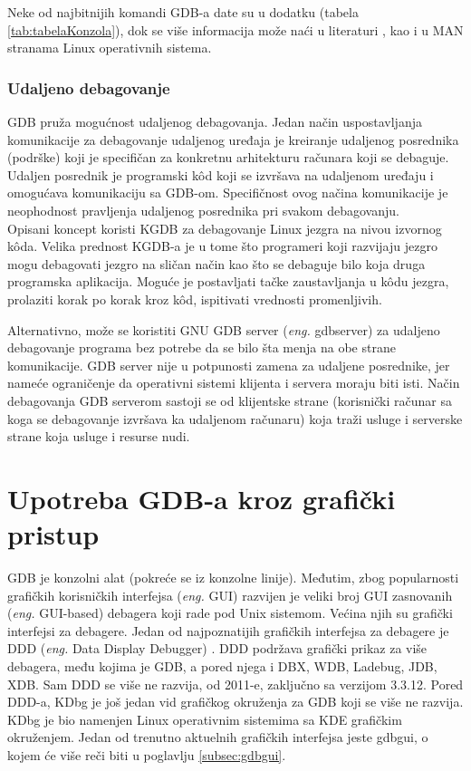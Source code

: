 \documentclass[a4paper]{article}
\begin{document}
Neke od najbitnijih komandi GDB-a date su u dodatku (tabela \ref{tab:tabelaKonzola}), dok se više informacija
može naći u literaturi \cite{commands},
kao i u MAN stranama Linux operativnih sistema. 


\subsubsection{Udaljeno debagovanje}
\label{subsec:gdb_udaljeno}

GDB pruža mogućnost udaljenog debagovanja. 
Jedan način uspostavljanja komunikacije za debagovanje udaljenog uređaja je kreiranje udaljenog posrednika (podrške) koji je specifičan za konkretnu arhitekturu računara koji se debaguje. Udaljen posrednik je programski k\^{o}d koji se izvršava na udaljenom uređaju i 
omogućava komunikaciju sa GDB-om. Specifičnost ovog načina komunikacije je neophodnost pravljenja udaljenog posrednika pri svakom debagovanju\cite{gdb}. \\
Opisani koncept koristi KGDB za debagovanje Linux jezgra na nivou izvornog k\^{o}da. Velika prednost KGDB-a 
je u tome što programeri koji razvijaju jezgro mogu debagovati jezgro na sličan način kao što se 
debaguje bilo koja druga programska aplikacija. Moguće je postavljati tačke zaustavljanja u k\^{o}du jezgra, prolaziti korak po korak kroz k\^{o}d, ispitivati vrednosti promenljivih\cite{kgd}.

Alternativno, može se koristiti GNU GDB server (\textit{eng.} gdbserver) za udaljeno debagovanje 
programa bez potrebe da se bilo šta menja na obe strane komunikacije. GDB server nije u potpunosti 
zamena za udaljene posrednike, jer nameće ograničenje da operativni sistemi klijenta i servera 
moraju biti isti. 
Način debagovanja GDB serverom sastoji se od klijentske strane (korisnički računar sa koga se 
debagovanje izvršava ka udaljenom računaru) koja traži usluge i serverske strane 
koja usluge i resurse nudi\cite{master_rad}. 

\section{Upotreba GDB-a kroz grafički pristup}
\label{subsec:gui}

GDB je konzolni alat (pokreće se iz konzolne linije). Međutim, zbog popularnosti grafičkih korisničkih interfejsa
(\textit{eng.} GUI) razvijen je veliki broj GUI zasnovanih (\textit{eng.} GUI-based) debagera koji rade pod Unix sistemom. Većina njih su grafički interfejsi za debagere. Jedan od najpoznatijih grafičkih interfejsa za debagere je DDD (\textit{eng.} Data Display Debugger) \cite{art_debugging}. DDD podržava grafički prikaz za više debagera, među kojima je
GDB, a pored njega i DBX, WDB, Ladebug, JDB, XDB. Sam DDD se više ne razvija, od 2011-e, zaključno sa verzijom 3.3.12. \cite{GNUOrg}
Pored DDD-a, KDbg je još jedan vid grafičkog okruženja za GDB koji se više ne razvija. KDbg je bio namenjen
Linux operativnim sistemima sa KDE grafičkim okruženjem. Jedan od trenutno aktuelnih grafičkih interfejsa jeste
gdbgui, o kojem će više reči biti u poglavlju \ref{subsec:gdbgui}.
\end{document}
